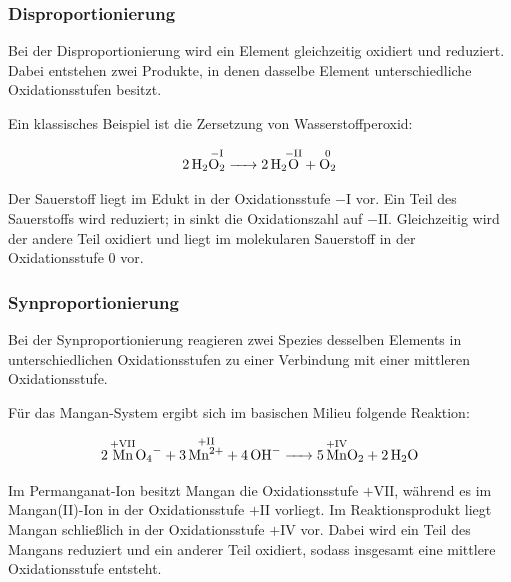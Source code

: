 \subsubsection{Disproportionierung}
\label{subsec:disprop}
Bei der Disproportionierung wird ein Element gleichzeitig oxidiert und reduziert. Dabei entstehen zwei Produkte, in denen dasselbe Element unterschiedliche Oxidationsstufen besitzt.

Ein klassisches Beispiel ist die Zersetzung von Wasserstoffperoxid:

\begin{equation}
    \ce{2H2 \!\overset{\mathrm{-I}}{O_2} -> 2H2\!\overset{\mathrm{-II}}{O} + \overset{0}{O_2}}
\end{equation}

Der Sauerstoff liegt im Edukt  in der Oxidationsstufe $\mathrm{-I}$ vor. Ein Teil des Sauerstoffs wird reduziert; in  sinkt die Oxidationszahl auf $\mathrm{-II}$. Gleichzeitig wird der andere Teil oxidiert und liegt im molekularen Sauerstoff  in der Oxidationsstufe $0$ vor. \cite{skript}

\subsubsection{Synproportionierung}
\label{subsec:synprop}
Bei der Synproportionierung reagieren zwei Spezies desselben Elements in unterschiedlichen Oxidationsstufen zu einer Verbindung mit einer mittleren Oxidationsstufe.

Für das Mangan-System ergibt sich im basischen Milieu folgende Reaktion:

\begin{equation}
    \ce{2\overset{ \mathrm{+VII}}{\ce{Mn}}O4^- + 3\overset{\mathrm{+II}}{Mn^{2+}} + 4 OH^- -> 5\overset{ \mathrm{+IV}}{\ce{Mn}}O2 + 2 H2O}
\end{equation}

Im Permanganat-Ion  besitzt Mangan die Oxidationsstufe $\mathrm{+VII}$, während es im Mangan(II)-Ion  in der Oxidationsstufe $\mathrm{+II}$ vorliegt. Im Reaktionsprodukt  liegt Mangan schließlich in der Oxidationsstufe $\mathrm{+IV}$ vor. Dabei wird ein Teil des Mangans reduziert und ein anderer Teil oxidiert, sodass insgesamt eine mittlere Oxidationsstufe entsteht.\cite{skript}

\newpage